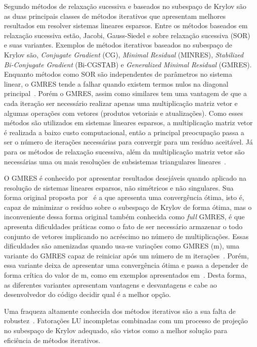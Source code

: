 \documentclass[
	12pt,				  %
	openright,		%
	twoside,			%
	a4paper,			%
	chapter=TITLE,		    %
	english,			%
	brazil				%
	]{abntex2}
\begin{document}
Segundo  métodos de relaxação sucessiva e baseados no
subespaço de Krylov são as duas principais classes de métodos iterativos que
apresentam melhores resultados em resolver sistemas lineares esparsos. Entre os
métodos baseados em relaxação sucessiva estão, Jacobi, Gauss-Siedel e sobre
relaxação sucessiva (SOR) e suas variantes. Exemplos de métodos iterativos
baseados no subespaço de Krylov são, \textit{Conjugate Gradient} (CG),
\textit{Minimal Residual} (MINRES), \textit{Stabilized Bi-Conjugate Gradient}
(Bi-CGSTAB) e \textit{Generalized Minimal Residual} (GMRES). Enquanto métodos
como SOR são independentes de parâmetros no sistema linear, o GMRES tende a
falhar quando existem termos nulos na diagonal principal~\cite{baglama2007}.
Porém o GMRES, assim como similares tem uma vantagem de que a cada iteração ser
necessário realizar apenas uma multiplicação matriz vetor e algumas operações
com vetores (produtos vetoriais e atualizações). Como esses métodos são
utilizados em sistemas lineares esparsos, a multiplicação matriz vetor é
realizada a baixo custo computacional, então a principal preocupação passa a
ser o número de iterações necessárias para convergir para um resíduo aceitável.
Já para os métodos de relaxação sucessiva, além da multiplicação matriz vetor
são necessárias uma ou mais resoluções de subsistemas triangulares
lineares~\cite{bai2015}.

O GMRES é conhecido por apresentar resultados desejáveis quando aplicado na
resolução de sistemas lineares esparsos, não simétricos e não singulares. Sua
forma original proposta por~ é a que apresenta uma
convergência ótima, isto é, capaz de minimizar o resíduo sobre o subespaço de
Krylov de forma ótima, mas o inconveniente dessa forma original também conhecida como
\textit{full} GMRES, é que apresenta dificuldades práticas como o fato de ser
necessário armazenar o todo conjunto de vetores implicando no acréscimo no número de
multiplicações. Essas dificuldades são amenizadas quando usa-se variações como
GMRES (m), uma variante do GMRES capaz de reiniciar após um número de m
iterações~\cite{vuik1994}. Porém, essa variante deixa de apresentar uma
convergência ótima e passa a depender de forma crítica do valor de m, como
em exemplos apresentados em~\cite{vorst1990}. Desta forma, as diferentes
variantes apresentam vantagens e desvantagens e cabe ao desenvolvedor do código
decidir qual é a melhor opção.

Uma fraqueza altamente conhecida dos métodos iterativos são a sua falta de
robustez~\cite{saad1994}. Fatorações LU incompletas combinadas com um processo
de projeção no subespaço de Krylov adequado, são vistos como a melhor solução
para eficiência de métodos iterativos. 
\end{document}
